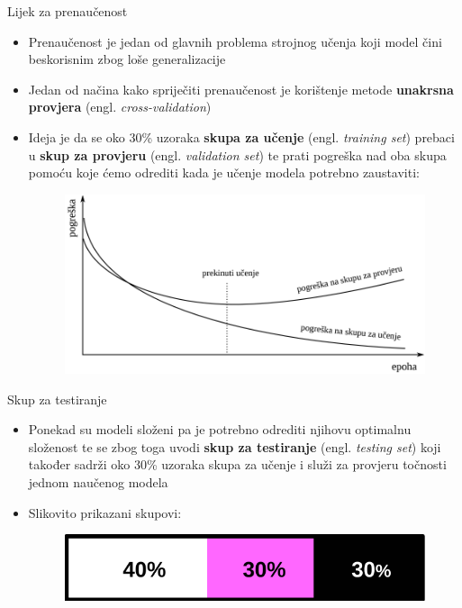 \documentclass{beamer}
\begin{document}
	\begin{frame}{Lijek za prenaučenost}
	    \begin{itemize}
	        \item Prenaučenost je jedan od glavnih problema strojnog učenja koji model čini beskorisnim zbog loše generalizacije
	        \item Jedan od načina kako spriječiti prenaučenost je korištenje metode \textbf{unakrsna provjera} (engl. \textit{cross-validation})
	        \item Ideja je da se oko 30\% uzoraka \textbf{skupa za učenje} (engl. \textit{training set}) prebaci u \textbf{skup za provjeru} (engl. \textit{validation set}) te prati pogreška nad oba skupa pomoću koje ćemo odrediti kada je učenje modela potrebno zaustaviti:
	        \smallskip
	        \pause
	        \begin{figure}
			    \includegraphics[scale=0.35]{img/cross-validation.png}
		    \end{figure}
	    \end{itemize}
	\end{frame}
    \begin{frame}{Skup za testiranje}
        \begin{itemize}
            \item Ponekad su modeli složeni pa je potrebno odrediti njihovu optimalnu složenost te se zbog toga uvodi \textbf{skup za testiranje} (engl. \textit{testing set}) koji također sadrži oko 30\% uzoraka skupa za učenje i služi za provjeru točnosti jednom naučenog modela
            \item Slikovito prikazani skupovi:
            \bigskip
            \begin{figure}
			    \includegraphics[scale=0.35]{img/skupovi.png}
		    \end{figure}
        \end{itemize}
    \end{frame}
\end{document}
